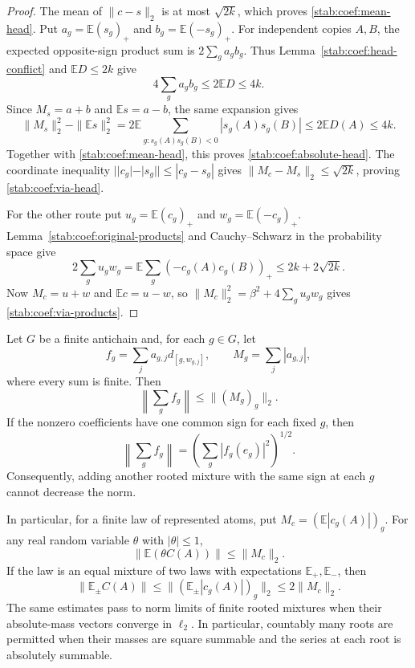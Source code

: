\begin{proof}
The mean of $\|c-s\|_2$ is at most $\sqrt{2k}$, which proves
\eqref{stab:coef:mean-head}. Put
$a_g=\mathbb E(s_g)_+$ and $b_g=\mathbb E(-s_g)_+$.
For independent copies $A,B$, the expected opposite-sign product
sum is $2\sum_g a_gb_g$. Thus
Lemma~\ref{stab:coef:head-conflict} and
$\mathbb E D\le2k$ give
\[
 4\sum_g a_gb_g\le2\mathbb E D\le4k.
\]
Since $M_s=a+b$ and $\mathbb E s=a-b$, the same expansion gives
\begin{equation}\label{stab:signed-unsigned}
 \|M_s\|_2^2-\|\mathbb E s\|_2^2
 =2\mathbb E\sum_{g:s_g(A)s_g(B)<0}|s_g(A)s_g(B)|
 \le2\mathbb E D(A)\le4k.
\end{equation}
Together with \eqref{stab:coef:mean-head}, this proves
\eqref{stab:coef:absolute-head}. The coordinate inequality
$||c_g|-|s_g||\le|c_g-s_g|$ gives
$\|M_c-M_s\|_2\le\sqrt{2k}$, proving
\eqref{stab:coef:via-head}.

For the other route put $u_g=\mathbb E(c_g)_+$ and
$w_g=\mathbb E(-c_g)_+$. Lemma~\ref{stab:coef:original-products}
and Cauchy--Schwarz in the probability space give
\[
 2\sum_g u_gw_g
 =\mathbb E\sum_g(-c_g(A)c_g(B))_+
 \le2k+2\sqrt{2k}.
\]
Now $M_c=u+w$ and $\mathbb E c=u-w$, so
$\|M_c\|_2^2=\beta^2+4\sum_g u_gw_g$ gives
\eqref{stab:coef:via-products}.
\end{proof}

\begin{lemma}
\label{stab:coef:tail-assembly}\label{stab:sign:rooted}
Let $G$ be a finite antichain and, for each $g\in G$, let
\[
 f_g=\sum_j a_{g,j}d_{[g,w_{g,j}]},\qquad
 M_g=\sum_j|a_{g,j}|,
\]
where every sum is finite. Then
\begin{equation}\label{stab:sign:absolute-masses}
 \left\|\sum_g f_g\right\|\le\|(M_g)_g\|_2.
\end{equation}
If the nonzero coefficients have one common sign for each fixed $g$,
then
\begin{equation}\label{stab:sign:rooted-equality}
 \left\|\sum_g f_g\right\|
 =\left(\sum_g|f_g(e_g)|^2\right)^{1/2}.
\end{equation}
Consequently, adding another rooted mixture with the same sign at
each $g$ cannot decrease the norm.

In particular, for a finite law of represented atoms, put
$M_c=(\mathbb E|c_g(A)|)_g$. For any real random variable $\theta$
with $|\theta|\le1$,
\begin{equation}\label{stab:coef:tail-assembly-eq}
 \|\mathbb E(\theta C(A))\|\le\|M_c\|_2.
\end{equation}
If the law is an equal mixture of two laws with expectations
$\mathbb E_+,\mathbb E_-$, then
\begin{equation}\label{stab:coef:conditional-assembly}
 \|\mathbb E_\pm C(A)\|
 \le\|(\mathbb E_\pm|c_g(A)|)_g\|_2\le2\|M_c\|_2.
\end{equation}
The same estimates pass to norm limits of finite rooted mixtures
when their absolute-mass vectors converge in $\ell_2$. In particular,
countably many roots are permitted when their masses are square
summable and the series at each root is absolutely summable.
\end{lemma}

